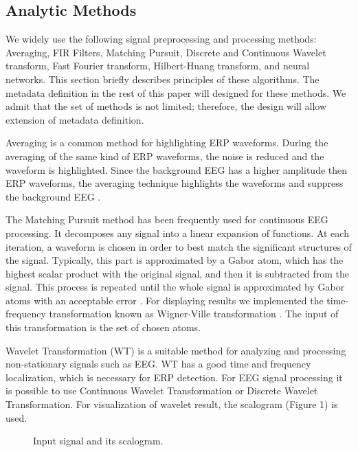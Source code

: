 \documentclass[a4paper,twoside]{article}
\begin{document}
\subsection{Analytic Methods}

\noindent We widely use the following signal preprocessing and processing methods: Averaging, FIR Filters, Matching Pursuit, Discrete and Continuous Wavelet transform, Fast Fourier transform, Hilbert-Huang transform, and neural networks. This section briefly describes principles of these algorithms. The metadata definition in the rest of this paper will designed for these methods. We admit that the set of methods is not limited; therefore, the design will allow extension of metadata definition.

Averaging \cite{Sanei07} is a common method for highlighting ERP waveforms. During the averaging of  the  same  kind  of  ERP  waveforms,  the  noise  is  reduced  and  the  waveform  is  highlighted. Since the background  EEG  has a higher  amplitude  then  ERP  waveforms, the averaging technique highlights the waveforms and suppress the background EEG \cite{Vidal77}.

The Matching Pursuit method has been frequently used for continuous EEG processing. It decomposes any signal into a linear expansion of functions. At each iteration, a waveform is chosen in order to best match the
significant structures of the signal. Typically, this part is approximated by a Gabor atom, which has the highest scalar
product with the original signal, and then it is subtracted from the signal. This process is repeated until the whole signal is
approximated by Gabor atoms with an acceptable error \cite{Vareka12}. For displaying results we implemented the time-frequency
transformation known as Wigner-Ville transformation \cite{Quian02}. The input of this transformation is the set of chosen atoms.

Wavelet Transformation (WT) \cite{Ciniburk10} is a suitable method for analyzing and processing non-stationary signals such as EEG.
WT has a good time and frequency localization, which is necessary for ERP detection. For EEG signal processing it is
possible to use Continuous Wavelet Transformation or Discrete Wavelet Transformation. For visualization of wavelet result, the scalogram (Figure 1) is used.

\begin{figure}[!h]

  \centering
   {}
  \caption{Input signal and its scalogram. \cite{Rondik12} }
  \label{fig:scalogram}
 \end{figure}
\end{document}
